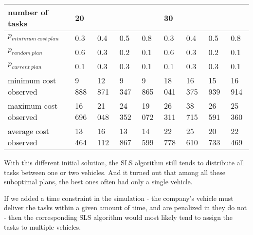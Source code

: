 \documentclass[10pt]{article}
\begin{document}
\begin{tabular}{|l|llll|llll|}
\hline
number of tasks & 20 & & & & 30 & & & \\
\hline
$p_{minimum\ cost\ plan}$ & 0.3 & 0.4 & 0.5 & 0.8 & 0.3 & 0.4 & 0.5 & 0.8\\
$p_{random\ plan}$        & 0.6 & 0.3 & 0.2 & 0.1 & 0.6 & 0.3 & 0.2 & 0.1\\
$p_{current\ plan}$       & 0.1 & 0.3 & 0.3 & 0.1 & 0.1 & 0.3 & 0.3 & 0.1\\
\hline
minimum cost observed & 9 888  & 12 871 & 9 347 & 9 865 & 18 041  & 16 375 & 15 939 & 16 914 \\
maximum cost observed & 16 696 & 21 048 & 24 352 & 19 072 & 26 311 & 38 715 & 26 591 & 25 360\\
\hline
average cost observed & 13 464 & 16 112 & 13 867 & 14 599 & 22 778 & 25 610 & 20 733 & 22 469\\
\hline
\end{tabular}
\label{table:model_parameters_2}
\vspace{4mm}

With this different initial solution, the SLS algorithm still tends to distribute all tasks between one or two vehicles.
And it turned out that among all these suboptimal plans, the best ones often had only a single vehicle.

If we added a time constraint in the simulation - the company's vehicle must deliver the tasks within a given amount of time, and are penalized in they do not - then the corresponding SLS algorithm would most likely tend to assign the tasks to multiple vehicles.
\end{document}
